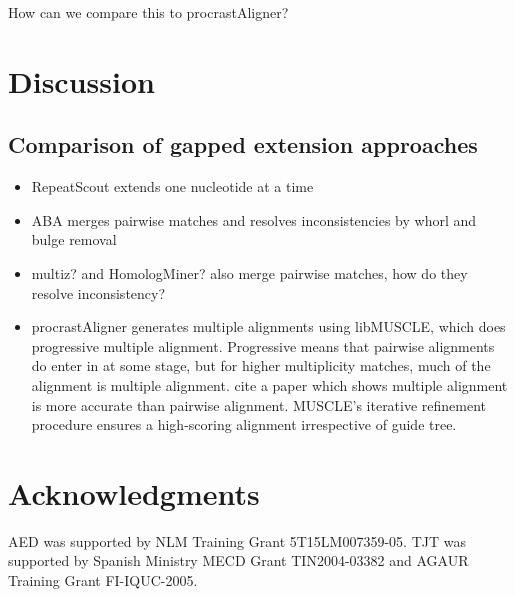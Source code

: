 \documentclass{llncs}
\begin{document}
How can we compare this to procrastAligner? 


\section{Discussion}

\subsection{Comparison of gapped
extension approaches}


\begin{itemize}

\item RepeatScout extends one nucleotide at a time
\item ABA merges pairwise matches and resolves inconsistencies by
whorl and bulge removal
\item multiz? and HomologMiner? also merge pairwise matches, how do
they resolve inconsistency?
\item procrastAligner generates multiple alignments using libMUSCLE,
which does progressive multiple alignment.  Progressive means that
pairwise alignments do enter in at some stage, but for higher
multiplicity matches, much of the alignment is multiple alignment.
cite a paper which shows multiple alignment is more accurate than
pairwise alignment.  MUSCLE's iterative refinement procedure ensures
a high-scoring alignment irrespective of guide tree.

\end{itemize}

\section{ Acknowledgments }
AED was supported by NLM Training Grant 5T15LM007359-05. TJT was
supported by Spanish Ministry MECD Grant TIN2004-03382 and AGAUR
Training Grant FI-IQUC-2005.


\small

\end{document}
